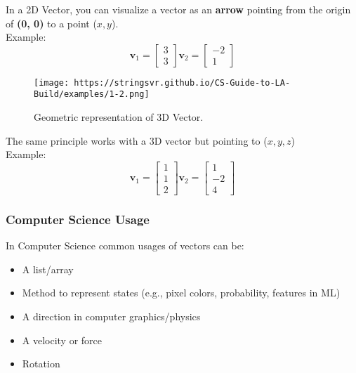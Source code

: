 \documentclass[12pt]{article}
\begin{document}
            In a 2D Vector, you can visualize a vector as an \textbf{arrow} pointing from the origin of \textbf{(0, 0)} to a point ($x, y$). \\
            Example:
            \begin{equation}
                \mathbf{v}_1 = \begin{bmatrix} 3 \\ 3 \end{bmatrix}
                \mathbf{v}_2 = \begin{bmatrix} -2 \\ 1 \end{bmatrix}
            \end{equation}
            
            \begin{figure}[H]
                \centering
                \texttt{[image: https://stringsvr.github.io/CS-Guide-to-LA-Build/examples/1-2.png]} 
                \caption{Geometric representation of 3D Vector.}
                \label{fig:2}
            \end{figure}
            
            The same principle works with a 3D vector but pointing to ($x, y, z$) \\
            Example:
            \begin{equation}
                \mathbf{v}_1 = \begin{bmatrix} 1 \\ 1 \\ 2 \end{bmatrix}
                \mathbf{v}_2 = \begin{bmatrix} 1 \\ -2 \\ 4 \end{bmatrix}
            \end{equation}

        \subsubsection{Computer Science Usage}
            In Computer Science common usages of vectors can be:
            \begin{itemize}
                \item A list/array
                \item Method to represent states (e.g., pixel colors, probability, features in ML)
                \item A direction in computer graphics/physics
                \item A velocity or force
                \item Rotation
            \end{itemize}
\end{document}
